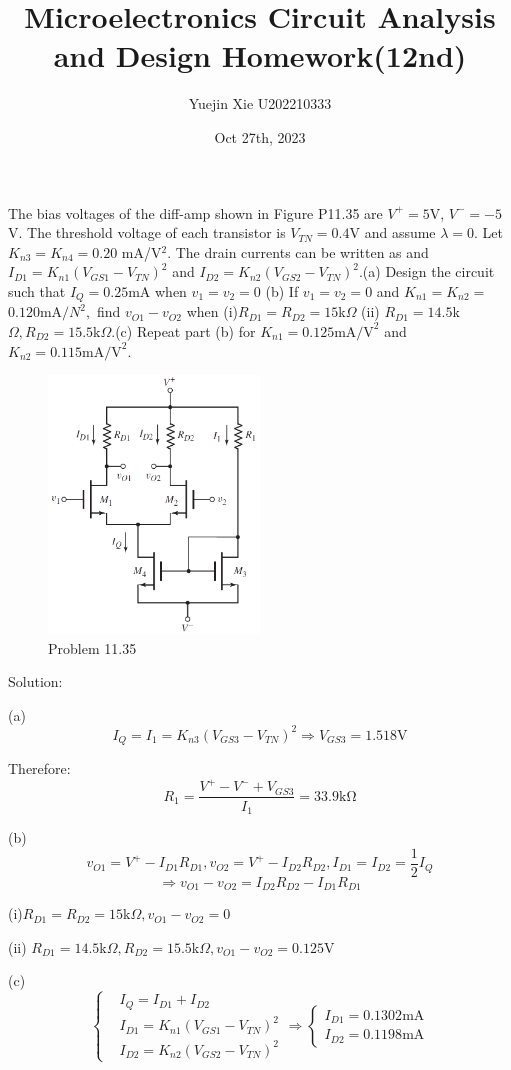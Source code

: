 \documentclass[a4paper,11pt,UTF8]{article}
\title{Microelectronics Circuit Analysis and Design Homework(12nd)}
\author{Yuejin Xie \quad U202210333}
\date{Oct 27th, 2023}
\begin{document}
 The bias voltages of the diff-amp shown in Figure P11.35 are $V^+=5$V, $V^-=-5$V. The threshold voltage of each transistor is  $V_{TN}=0.4$V and assume $\lambda=0$. Let $K_{n3}=K_{n4}=0.20$ mA/V$^{2}$. The drain currents can be written as and $I_{D1}=K_{n1}\left(V_{GS1}-V_{TN}\right)^{2}$ and $I_{D2}=K_{n2}\left(V_{GS2}-V_{TN}\right)^{2}$.(a) Design the circuit  such that $I_Q=0.25$mA when $v_{1}=v_2=0$ (b) If $v_1= v_2= 0$ and $K_{n1}= K_{n2}= $ $ {0.120}$mA$/N^2,$ find $v_{O1}- v_{O2}$ when (i)$ R_{D1}=R_{D2}=15$k$\Omega$ (ii) $R_{D1}= 14.5$k$\Omega, R_{D2}= 15.5$k$\Omega$.(c) Repeat part (b)  for $K_{n1}= 0.125\mathrm{mA/V}^{2}$ and $K_{n2}= 0.115\mathrm{mA/V}^{2}.$
\begin{figure}[H]
	\centering
	\includegraphics[width=0.5\textwidth]{11.35}
	\caption{Problem 11.35}
\end{figure}
\noindent Solution:

(a)$$
	I_{Q}=I_1=K_{n3}(V_{GS3}-V_{TN})^2\Rightarrow V_{GS3}=1.518\mathrm{V}
$$

Therefore:
$$
	R_1=\frac{V^+-V^-+V_{GS3}}{I_1}=33.9\mathrm{k\Omega}
$$

(b)$$
	v_{O1}=V^+-I_{D1}R_{D1},v_{O2}=V^+-I_{D2}R_{D2},I_{D1}=I_{D2}=\frac12I_Q
$$
$$
	\Rightarrow v_{O1}-v_{O2}=I_{D2}R_{D2}-I_{D1}R_{D1}
$$

(i)$ R_{D1}=R_{D2}=15$k$\Omega,v_{O1}-v_{O2}=0$

(ii) $R_{D1}= 14.5$k$\Omega, R_{D2}= 15.5$k$\Omega,v_{O1}-v_{O2}=0.125$V

(c)
$$\left\{\begin{aligned}
	&I_{Q}=I_{D1}+I_{D2}\\
	&I_{D1}=K_{n1}\left(V_{GS1}-V_{TN}\right)^{2}\\ &I_{D2}=K_{n2}\left(V_{GS2}-V_{TN}\right)^{2}
\end{aligned}\right.
\Rightarrow\begin{cases}
	I_{D1}=0.1302\mathrm{mA}\\
	I_{D2}=0.1198\mathrm{mA}
\end{cases}
$$
\end{document}
